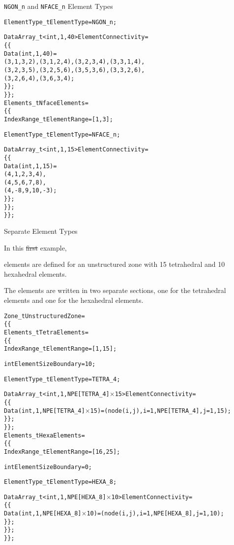 \begin{changes}
\begin{example}{\texttt{NGON\_n} and \texttt{NFACE\_n} Element Types}
\begin{alltt}
      ElementType\_t ElementType = NGON\_n ;

      DataArray\_t<int, 1, 40> ElementConnectivity =
        \{\{
        Data(int, 1, 40) =
          (3, 1, 3, 2), (3, 1, 2, 4), (3, 2, 3, 4), (3, 3, 1, 4),
          (3, 2, 3, 5), (3, 2, 5, 6), (3, 5, 3, 6), (3, 3, 2, 6),
          (3, 2, 6, 4), (3, 6, 3, 4) ;
        \}\} ;
      \}\} ;
    Elements\_t NfaceElements =
      \{\{
      IndexRange\_t ElementRange = [1,3] ;

      ElementType\_t ElementType = NFACE\_n ;

      DataArray\_t<int, 1, 15> ElementConnectivity =
        \{\{
        Data(int, 1, 15) =
          (4,  1,  2,  3,  4),
          (4,  5,  6,  7,  8),
          (4, -8,  9, 10, -3) ;
        \}\} ;
      \}\} ;
    \}\} ;
\end{alltt}
\end{example}\end{changes}

\begin{example}{Separate Element Types}
\label{ex:elements3}

In this \sout{first} example, \begin{changes}elements are defined for an unstructured zone with 15
tetrahedral and 10 hexahedral elements.\end{changes}
The elements are written in two separate sections, one for the
tetrahedral elements and one for the hexahedral elements.
\begin{alltt}
  Zone\_t UnstructuredZone =
    \{\{
    Elements\_t TetraElements =
      \{\{
      IndexRange\_t ElementRange = [1,15] ;

      int ElementSizeBoundary = 10 ;

      ElementType\_t ElementType = TETRA\_4 ;

      DataArray\_t<int, 1, NPE[TETRA\_4]\(\times\)15> ElementConnectivity =
        \{\{
        Data(int, 1, NPE[TETRA\_4]\(\times\)15) = (node(i,j), i=1,NPE[TETRA\_4], j=1,15) ;
        \}\} ;
      \}\} ;
    Elements\_t HexaElements =
      \{\{
      IndexRange\_t ElementRange = [16,25] ;

      int ElementSizeBoundary = 0 ;

      ElementType\_t ElementType = HEXA\_8 ;

      DataArray\_t<int, 1, NPE[HEXA\_8]\(\times\)10> ElementConnectivity =
        \{\{
        Data(int, 1, NPE[HEXA\_8]\(\times\)10) = (node(i,j), i=1,NPE[HEXA\_8], j=1,10) ;
        \}\} ;
      \}\} ;
    \}\} ;
\end{alltt}
\end{example}

